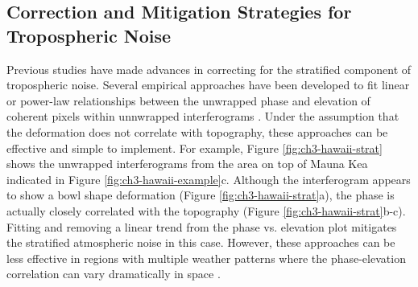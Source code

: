 

\subsection{Correction and Mitigation Strategies for Tropospheric Noise}
\label{sec:ch3-noise-tropo-mitigate}





Previous studies have made advances in correcting for the stratified component of tropospheric noise.  Several empirical approaches have been developed to fit linear or power-law relationships between the unwrapped phase and elevation of coherent pixels within unnwrapped interferograms \citep{Elliott2008InsarSlipRate, Lauknes2011InsarTroposphericStratification, Bekaert2015SpatiallyVariablePower, Zebker2021AccuracyModelFree, Murray2021ClusterBasedEmpirical}. Under the assumption that the deformation does not correlate with topography, these approaches can be effective and simple to implement. For example, Figure \ref{fig:ch3-hawaii-strat} shows the unwrapped interferograms from the area on top of Mauna Kea indicated in Figure \ref{fig:ch3-hawaii-example}c. Although the interferogram appears to show a bowl shape deformation (Figure \ref{fig:ch3-hawaii-strat}a), the phase is actually closely correlated with the topography (Figure \ref{fig:ch3-hawaii-strat}b-c). Fitting and removing a linear trend from the phase vs. elevation plot mitigates the stratified atmospheric noise in this case. However, these approaches can be less effective in regions with multiple weather patterns where the phase-elevation correlation can vary dramatically in space \cite{Murray2021ClusterBasedEmpirical}.

